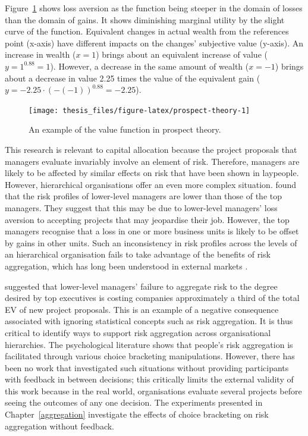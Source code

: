 \documentclass[a4paper, nobind, dvipsnames]{templates/ociamthesis}
\theoremstyle{definition}
\theoremstyle{definition}
\theoremstyle{definition}
\theoremstyle{definition}
\theoremstyle{remark}
\begin{document}
Figure~\ref{fig:prospect-theory} shows loss aversion as the function being
steeper in the domain of losses than the domain of gains. It shows diminishing
marginal utility by the slight curve of the function. Equivalent changes in
actual wealth from the references point (x-axis) have different impacts on the
changes' subjective value (y-axis). An increase in wealth (\(x = 1\)) brings about
an equivalent increase of value (\(y = 1^{0.88} = 1\)). However, a decrease in the
same amount of wealth (\(x = -1\)) brings about a decrease in value 2.25 times the
value of the equivalent gain (\(y = -2.25 \cdot (-(-1))^{0.88} = -2.25\)).



\begin{figure}
\texttt{[image: thesis\_files/figure-latex/prospect-theory-1]} \caption{An example of the value function in prospect theory.}\label{fig:prospect-theory}
\end{figure}

This research is relevant to capital allocation because the project proposals
that managers evaluate invariably involve an element of risk. Therefore,
managers are likely to be affected by similar effects on risk that have been
shown in laypeople. However, hierarchical organisations offer an even more
complex situation. \textcite{lovallo2020} found that the risk profiles of lower-level
managers are lower than those of the top managers. They suggest that this may be
due to lower-level managers' loss aversion to accepting projects that may
jeopardise their job. However, the top managers recognise that a loss in one or
more business units is likely to be offset by gains in other units. Such an
inconsistency in risk profiles across the levels of an hierarchical organisation
fails to take advantage of the benefits of risk aggregation, which has long been
understood in external markets \autocite{markowitz1952}.

\textcite{lovallo2020} suggested that lower-level managers' failure to aggregate risk to
the degree desired by top executives is costing companies approximately a third
of the total EV of new project proposals. This is an example of a negative
consequence associated with ignoring statistical concepts such as risk
aggregation. It is thus critical to identify ways to support risk aggregation
across organisational hierarchies. The psychological literature shows that
people's risk aggregation is facilitated through various choice bracketing
manipulations. However, there has been no work that investigated such situations
without providing participants with feedback in between decisions; this
critically limits the external validity of this work because in the real world,
organisations evaluate several projects before seeing the outcomes of any one
decision. The experiments presented in Chapter~\ref{aggregation} investigate
the effects of choice bracketing on risk aggregation without feedback.
\end{document}
